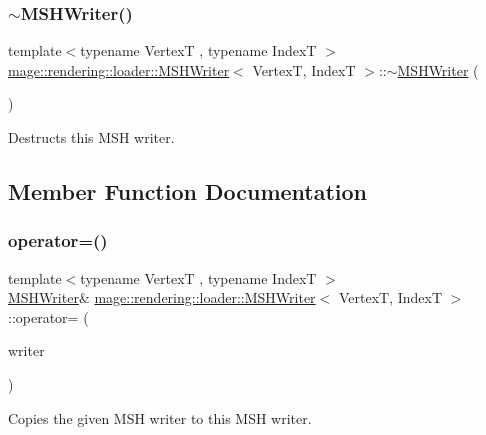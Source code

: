 \subsubsection{\texorpdfstring{$\sim$\+M\+S\+H\+Writer()}{~MSHWriter()}}
{\footnotesize\ttfamily template$<$typename VertexT , typename IndexT $>$ \\
\hyperlink{classmage_1_1rendering_1_1loader_1_1_m_s_h_writer}{mage\+::rendering\+::loader\+::\+M\+S\+H\+Writer}$<$ VertexT, IndexT $>$\+::$\sim$\hyperlink{classmage_1_1rendering_1_1loader_1_1_m_s_h_writer}{M\+S\+H\+Writer} (\begin{DoxyParamCaption}{ }\end{DoxyParamCaption})}

Destructs this M\+SH writer. 

\subsection{Member Function Documentation}
\hypertarget{classmage_1_1rendering_1_1loader_1_1_m_s_h_writer_a661eaab96539a7bf08f100095603af0e}{}\label{classmage_1_1rendering_1_1loader_1_1_m_s_h_writer_a661eaab96539a7bf08f100095603af0e} 
\subsubsection{\texorpdfstring{operator=()}{operator=()}\hspace{0.1cm}{\footnotesize\ttfamily [1/2]}}
{\footnotesize\ttfamily template$<$typename VertexT , typename IndexT $>$ \\
\hyperlink{classmage_1_1rendering_1_1loader_1_1_m_s_h_writer}{M\+S\+H\+Writer}\& \hyperlink{classmage_1_1rendering_1_1loader_1_1_m_s_h_writer}{mage\+::rendering\+::loader\+::\+M\+S\+H\+Writer}$<$ VertexT, IndexT $>$\+::operator= (\begin{DoxyParamCaption}\item[{const \hyperlink{classmage_1_1rendering_1_1loader_1_1_m_s_h_writer}{M\+S\+H\+Writer}$<$ VertexT, IndexT $>$ \&}]{writer }\end{DoxyParamCaption})\hspace{0.3cm}{\ttfamily [delete]}}

Copies the given M\+SH writer to this M\+SH writer.


